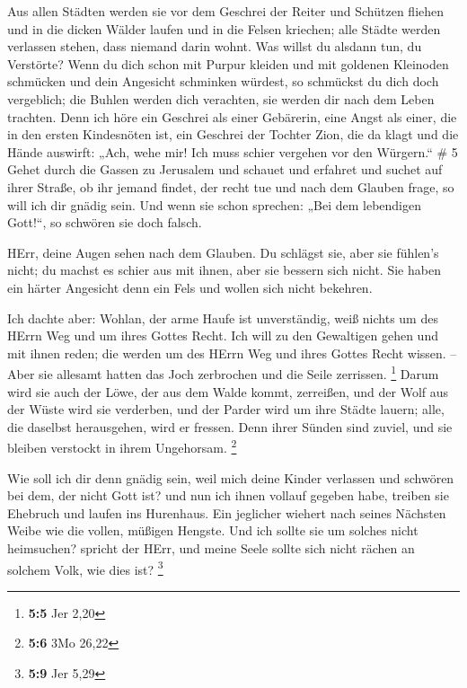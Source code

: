  Aus allen Städten werden sie vor dem Geschrei der Reiter
und Schützen fliehen und in die dicken Wälder laufen und in die Felsen
kriechen; alle Städte werden verlassen stehen, dass niemand darin wohnt.
 Was willst du alsdann tun, du Verstörte? Wenn du dich
schon mit Purpur kleiden und mit goldenen Kleinoden schmücken und dein
Angesicht schminken würdest, so schmückst du dich doch vergeblich; die
Buhlen werden dich verachten, sie werden dir nach dem Leben trachten.
 Denn ich höre ein Geschrei als einer Gebärerin, eine Angst
als einer, die in den ersten Kindesnöten ist, ein Geschrei der Tochter
Zion, die da klagt und die Hände auswirft: „Ach, wehe mir! Ich muss
schier vergehen vor den Würgern.`` \# 5  Gehet durch die
Gassen zu Jerusalem und schauet und erfahret und suchet auf ihrer
Straße, ob ihr jemand findet, der recht tue und nach dem Glauben frage,
so will ich dir gnädig sein.  Und wenn sie schon sprechen:
„Bei dem lebendigen Gott!{}``, so schwören sie doch falsch.

 HErr, deine Augen sehen nach dem Glauben. Du schlägst sie,
aber sie fühlen's nicht; du machst es schier aus mit ihnen, aber sie
bessern sich nicht. Sie haben ein härter Angesicht denn ein Fels und
wollen sich nicht bekehren.

 Ich dachte aber: Wohlan, der arme Haufe ist unverständig,
weiß nichts um des HErrn Weg und um ihres Gottes Recht.  Ich
will zu den Gewaltigen gehen und mit ihnen reden; die werden um des
HErrn Weg und ihres Gottes Recht wissen. -- Aber sie allesamt hatten das
Joch zerbrochen und die Seile zerrissen. \footnote{\textbf{5:5} Jer 2,20}
 Darum wird sie auch der Löwe, der aus dem Walde kommt,
zerreißen, und der Wolf aus der Wüste wird sie verderben, und der Parder
wird um ihre Städte lauern; alle, die daselbst herausgehen, wird er
fressen. Denn ihrer Sünden sind zuviel, und sie bleiben verstockt in
ihrem Ungehorsam. \footnote{\textbf{5:6} 3Mo 26,22}

 Wie soll ich dir denn gnädig sein, weil mich deine Kinder
verlassen und schwören bei dem, der nicht Gott ist? und nun ich ihnen
vollauf gegeben habe, treiben sie Ehebruch und laufen ins Hurenhaus.
 Ein jeglicher wiehert nach seines Nächsten Weibe wie die
vollen, müßigen Hengste.  Und ich sollte sie um solches
nicht heimsuchen? spricht der HErr, und meine Seele sollte sich nicht
rächen an solchem Volk, wie dies ist? \footnote{\textbf{5:9} Jer 5,29}

